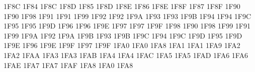 \setcclcucx 1F8C 1F84 1F8C %
\setcclcucx 1F8D 1F85 1F8D %
\setcclcucx 1F8E 1F86 1F8E %
\setcclcucx 1F8F 1F87 1F8F %
\setcclcucx 1F90 1F90 1F98 %
\setcclcucx 1F91 1F91 1F99 %
\setcclcucx 1F92 1F92 1F9A %
\setcclcucx 1F93 1F93 1F9B %
\setcclcucx 1F94 1F94 1F9C %
\setcclcucx 1F95 1F95 1F9D %
\setcclcucx 1F96 1F96 1F9E %
\setcclcucx 1F97 1F97 1F9F %
\setcclcucx 1F98 1F90 1F98 %
\setcclcucx 1F99 1F91 1F99 %
\setcclcucx 1F9A 1F92 1F9A %
\setcclcucx 1F9B 1F93 1F9B %
\setcclcucx 1F9C 1F94 1F9C %
\setcclcucx 1F9D 1F95 1F9D %
\setcclcucx 1F9E 1F96 1F9E %
\setcclcucx 1F9F 1F97 1F9F %
\setcclcucx 1FA0 1FA0 1FA8 %
\setcclcucx 1FA1 1FA1 1FA9 %
\setcclcucx 1FA2 1FA2 1FAA %
\setcclcucx 1FA3 1FA3 1FAB %
\setcclcucx 1FA4 1FA4 1FAC %
\setcclcucx 1FA5 1FA5 1FAD %
\setcclcucx 1FA6 1FA6 1FAE %
\setcclcucx 1FA7 1FA7 1FAF %
\setcclcucx 1FA8 1FA0 1FA8 %
